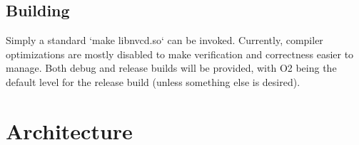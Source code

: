 \documentclass[8pt, a4paper, twoside, twoclumn, english]{extreport}
\begin{document}
\subsection {Building}

\begin{flushleft}
  Simply a standard `make libnvcd.so` can be invoked. Currently, compiler optimizations
  are mostly disabled to make verification and correctness easier to manage. Both debug
  and release builds will be provided, with O2 being the default level for the release
  build (unless something else is desired).
\end{flushleft}

\section {Architecture}
\end{document}
